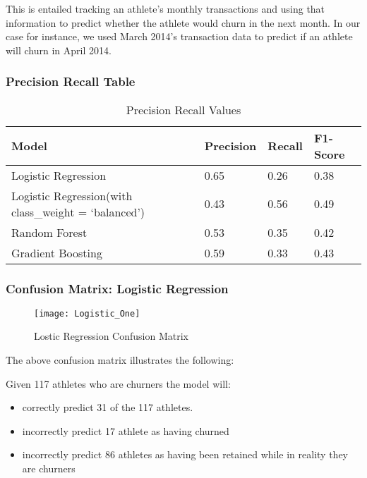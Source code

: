 \documentclass[
10pt, %
a4paper, %
oneside, %
headinclude,footinclude, %
BCOR5mm, %
]{scrartcl}
\begin{document}
This is entailed tracking an athlete's monthly transactions and using that information to predict whether the athlete would churn in the next month. In our case for instance, we used March 2014's transaction data to predict if an athlete will churn in April 2014.

\subsubsection{Precision Recall Table} 

\begin{table}[H]
\centering
\caption{Precision Recall Values}
\label{my-label}
\begin{tabular}{@{}llll@{}}
\toprule
Model               & Precision & Recall & F1-Score \\ \midrule
Logistic Regression & 0.65      & 0.26   & 0.38     \\
Logistic Regression(with class\_weight = `balanced') & 0.43      & 0.56   & 0.49     \\
Random Forest       & 0.53      & 0.35   & 0.42     \\
Gradient Boosting   & 0.59      & 0.33   & 0.43     \\ \bottomrule
\end{tabular}
\end{table}

\subsubsection{\textbf{Confusion Matrix}: Logistic Regression}

\begin{figure}[H]
\centering 
\texttt{[image: Logistic\_One]} 
\caption[Lostic Regression Confusion Matrix]{Lostic Regression Confusion Matrix} %
\label{fig:gallery} 
\end{figure}

The above confusion matrix illustrates the following: 

Given 117 athletes who are churners the model will:

\begin{itemize}
\item correctly predict 31 of the 117 athletes. 
\item incorrectly predict 17 athlete as having churned 
\item incorrectly predict 86 athletes as having been retained while in reality they are churners
\end{itemize}
\end{document}

